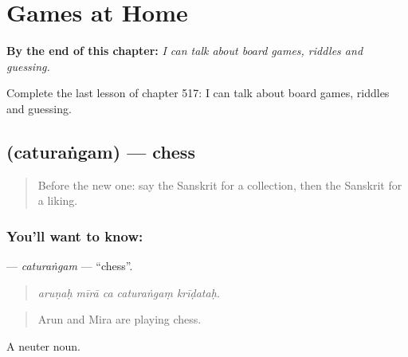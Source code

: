 
\chapter{Games at Home}
\label{ch:sa-games-at-home}

\begin{chapteropening}
\textbf{By the end of this chapter:} \emph{I can talk about board games, riddles and guessing.}

Complete the last lesson of chapter 517: I can talk about board games, riddles and guessing.
\end{chapteropening}

\section[\texorpdfstring{\sk{चतुरंगम्} (caturaṅgam)}{चतुरंगम् (caturaṅgam)}]{ (caturaṅgam) — chess}

\label{lesson:SA-C517-caturangam}



\begin{quote}
Before the new one: say the Sanskrit for a collection, then the Sanskrit for a liking.
\end{quote}

\subsection*{You'll want to know: }
\textbf{} — \emph{caturaṅgam} — \textquotedblleft{}chess\textquotedblright{}.

\begin{quote}
    
\end{quote}

\begin{quote}
\emph{aruṇaḥ mīrā ca caturaṅgaṃ krīḍataḥ.}
\end{quote}

\begin{quote}
Arun and Mira are playing chess.
\end{quote}

A neuter noun.

